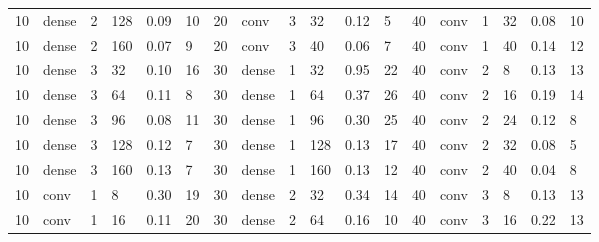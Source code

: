 \begin{table}[t!]
{\begin{tabular}{@{}llllll|llllll|llllll@{}}
10          & dense      & 2          & 128        & 0.09         & 10           & 20          & conv       & 3          & 32         & 0.12         & 5            & 40          & conv       & 1          & 32         & 0.08         & 10           \\
10          & dense      & 2          & 160        & 0.07         & 9            & 20          & conv       & 3          & 40         & 0.06         & 7            & 40          & conv       & 1          & 40         & 0.14         & 12           \\
10          & dense      & 3          & 32         & 0.10         & 16           & 30          & dense      & 1          & 32         & 0.95         & 22           & 40          & conv       & 2          & 8          & 0.13         & 13           \\
10          & dense      & 3          & 64         & 0.11         & 8            & 30          & dense      & 1          & 64         & 0.37         & 26           & 40          & conv       & 2          & 16         & 0.19         & 14           \\
10          & dense      & 3          & 96         & 0.08         & 11           & 30          & dense      & 1          & 96         & 0.30         & 25           & 40          & conv       & 2          & 24         & 0.12         & 8            \\
10          & dense      & 3          & 128        & 0.12         & 7            & 30          & dense      & 1          & 128        & 0.13         & 17           & 40          & conv       & 2          & 32         & 0.08         & 5            \\
10          & dense      & 3          & 160        & 0.13         & 7            & 30          & dense      & 1          & 160        & 0.13         & 12           & 40          & conv       & 2          & 40         & 0.04         & 8            \\
10          & conv       & 1          & 8          & 0.30         & 19           & 30          & dense      & 2          & 32         & 0.34         & 14           & 40          & conv       & 3          & 8          & 0.13         & 13           \\
10          & conv       & 1          & 16         & 0.11         & 20           & 30          & dense      & 2          & 64         & 0.16         & 10           & 40          & conv       & 3          & 16         & 0.22         & 13           \\

\end{tabular}}
\end{table}
